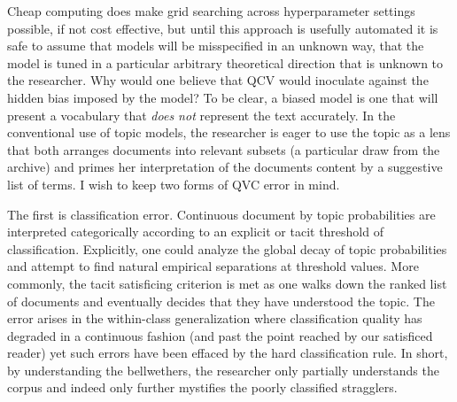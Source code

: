 \documentclass[]{book}
\theoremstyle{definition}
\theoremstyle{definition}
\theoremstyle{definition}
\theoremstyle{remark}
\begin{document}
Cheap computing does make grid searching across hyperparameter settings
possible, if not cost effective, but until this approach is usefully
automated it is safe to assume that models will be misspecified in an
unknown way, that the model is tuned in a particular arbitrary
theoretical direction that is unknown to the researcher. Why would one
believe that QCV would inoculate against the hidden bias imposed by the
model? To be clear, a biased model is one that will present a vocabulary
that \emph{does not} represent the text accurately. In the conventional
use of topic models, the researcher is eager to use the topic as a lens
that both arranges documents into relevant subsets (a particular draw
from the archive) and primes her interpretation of the documents content
by a suggestive list of terms. I wish to keep two forms of QVC error in
mind.

The first is classification error. Continuous document by topic
probabilities are interpreted categorically according to an explicit or
tacit threshold of classification. Explicitly, one could analyze the
global decay of topic probabilities and attempt to find natural
empirical separations at threshold values. More commonly, the tacit
satisficing criterion is met as one walks down the ranked list of
documents and eventually decides that they have understood the topic.
The error arises in the within-class generalization where classification
quality has degraded in a continuous fashion (and past the point reached
by our satisficed reader) yet such errors have been effaced by the hard
classification rule. In short, by understanding the bellwethers, the
researcher only partially understands the corpus and indeed only further
mystifies the poorly classified stragglers.
\end{document}
